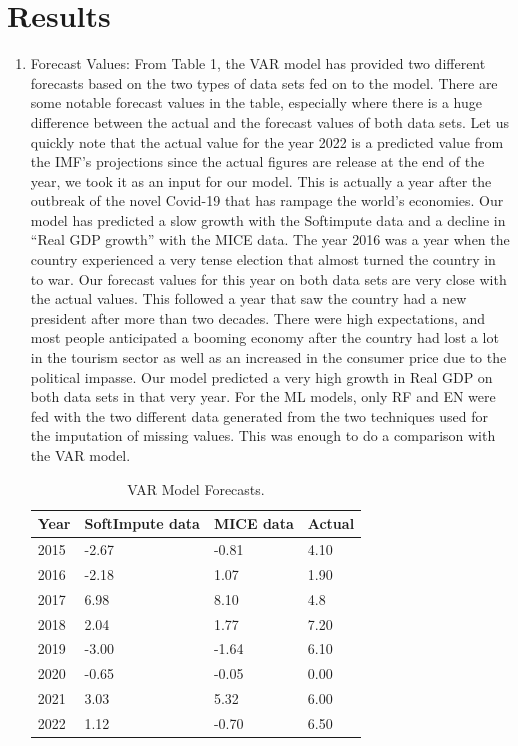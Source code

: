\documentclass[12pt,italian, twoside]{report}
\begin{document}
\section{Results}
\begin{enumerate}
	\item Forecast Values:
	From Table 1, the VAR model has provided two different forecasts based on the two types of data sets fed on to the model.  There are some notable forecast values in the table, especially where there is a huge difference between the actual and the forecast values of both data sets. Let us quickly note that the actual value for the year 2022 is a predicted value from the IMF’s projections since the actual figures are release at the end of the year, we took it as an input for our model. This is actually a year after the outbreak of the novel Covid-19 that has rampage the world’s economies. Our model has predicted a slow growth with the Softimpute data and a decline in “Real GDP growth” with the MICE data. The year 2016 was a year when the country experienced a very tense election that almost turned the country in to war. Our forecast values for this year on both data sets are very close with the actual values. This followed a year that saw the country had a new president after more than two decades. There were high expectations, and most people anticipated a booming economy after the country had lost a lot in the tourism sector as well as an increased in the consumer price due to the political impasse. Our model predicted a very high growth in Real GDP on both data sets in that very year. 
	For the ML models, only RF and EN were fed with the two different data generated from the two techniques used for the imputation of missing values. This was enough to do a comparison with the VAR model.
	        \begin{table}
	        	\centering
	        	\begin{tabular}{|l|l|l|l|}
	        		\hline
	        		Year & SoftImpute data & MICE data &  Actual \\ \hline
	        		2015 &   -2.67               &  -0.81                  & 4.10     \\
	        		2016 &   -2.18                     & 1.07                &  1.90     \\
	        		2017 &     6.98             &        8.10                 &  4.8       \\ 
	        		2018  &   2.04                      & 1.77                 &   7.20      \\
	        		2019   &  -3.00                      & -1.64              &  6.10          \\
	        		2020   & -0.65                         & -0.05            &  0.00         \\
	        		2021  &    3.03                       &     5.32             & 6.00           \\
	        		2022 &     1.12                     &       -0.70            &   6.50         \\ \hline
	        	\end{tabular}
	        	\caption{VAR Model Forecasts.}
	        	\label{tab:VAR}
	        \end{table}
	        

\end{enumerate}
\end{document}
